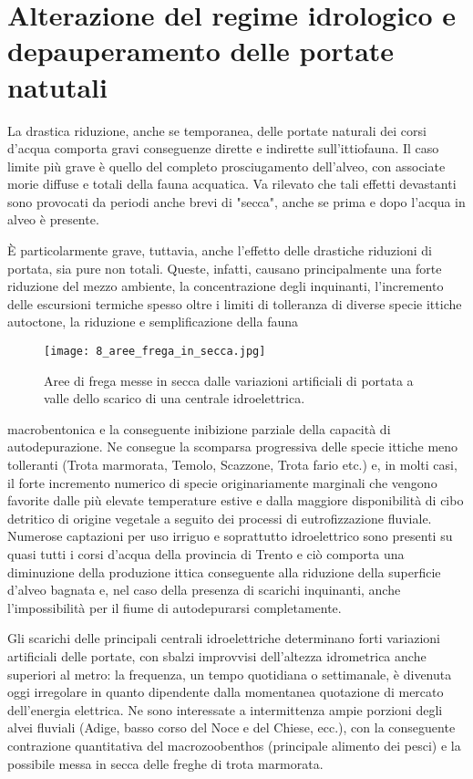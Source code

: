 \documentclass[10pt,twoside,openany,x11names,svgnames,italian,a5paper,dvipsnames,table]{memoir}
\begin{document}
\section[Alterazione del regime idrologico]{Alterazione del regime idrologico e depauperamento delle portate natutali}

La drastica riduzione, anche se temporanea, delle portate naturali dei corsi d'acqua comporta gravi conseguenze dirette e indirette sull'ittiofauna. Il caso limite più grave è quello del completo prosciugamento dell'alveo, con associate morie diffuse e totali della fauna acquatica. Va rilevato che tali effetti devastanti sono provocati da periodi anche brevi di "secca", anche se prima e dopo l'acqua in alveo è presente.

È particolarmente grave, tuttavia, anche l'effetto delle drastiche riduzioni di portata, sia pure non totali. Queste, infatti, causano principalmente una forte riduzione del mezzo ambiente, la concentrazione degli inquinanti, l'incremento delle escursioni termiche spesso oltre i limiti di tolleranza di diverse specie ittiche autoctone, la riduzione e semplificazione della fauna \begin{wrapfigure}[16]{r}{.6\textwidth}
\vspace*{-.4cm}
\centering
\texttt{[image: 8\_aree\_frega\_in\_secca.jpg]}
\caption*{Aree di frega messe in secca dalle variazioni artificiali di portata a valle dello scarico di una centrale idroelettrica.}
\end{wrapfigure}
macrobentonica e la conseguente inibizione parziale della capacità di autodepurazione. Ne consegue la scomparsa progressiva delle specie ittiche meno tolleranti (Trota marmorata, Temolo, Scazzone, Trota fario etc.) e, in molti casi, il forte incremento numerico di specie originariamente marginali che vengono favorite dalle più elevate temperature estive e dalla maggiore disponibilità di cibo detritico di origine vegetale a seguito dei processi di eutrofizzazione fluviale. 
Numerose captazioni per uso irriguo e soprattutto idroelettrico sono presenti su quasi tutti i corsi d’acqua della provincia di Trento e ciò comporta una diminuzione della produzione ittica conseguente alla riduzione della superficie d’alveo bagnata e, nel caso della presenza di scarichi inquinanti, anche l’impossibilità per il fiume di autodepurarsi completamente.

Gli scarichi delle principali centrali idroelettriche determinano forti variazioni artificiali delle portate, con sbalzi improvvisi dell’altezza idrometrica anche superiori al metro: la frequenza, un tempo quotidiana o settimanale, è divenuta oggi irregolare in quanto dipendente dalla momentanea quotazione di mercato dell’energia elettrica. Ne sono interessate a intermittenza ampie porzioni degli alvei fluviali (Adige, basso corso del Noce e del Chiese, ecc.), con la conseguente contrazione quantitativa del macrozoobenthos (principale alimento dei pesci) e la possibile messa in secca delle freghe di trota marmorata.
\end{document}
